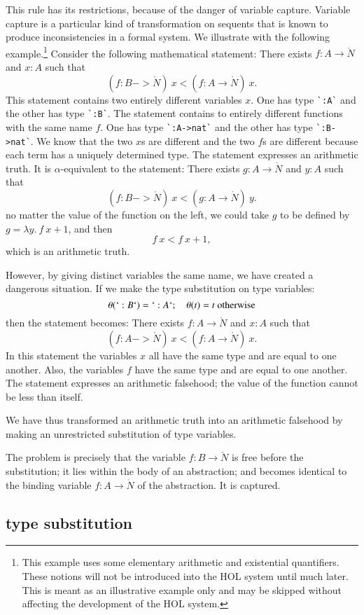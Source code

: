 \documentclass[cup9a]{cupbook}
\begin{document}
This rule has its restrictions, because of the danger of variable capture.  Variable capture is a particular kind of transformation on sequents that is known to produce inconsistencies in a formal system.  We illustrate with the following example.\footnote{This example uses some elementary arithmetic and existential quantifiers.  These notions will not be introduced into the HOL system until much later.  This is meant as an illustrative example only and may be skipped without affecting the development of the HOL system.}  Consider the following mathematical statement: There exists $f:A\to\ring{N}$ and $x:A$ such that
$$
(f:B->\ring{N})~x < (f:A\to\ring{N})~x.
$$
This statement contains two entirely different variables $x$.  One has type \verb!`:A`! and the other has type \verb!`:B`!.  The statement contains to entirely different functions with the same name $f$.  One has type \verb!`:A->nat`! and the other has type \verb!`:B->nat`!.  We know that the two $x$s are different and the two $f$s are different because each term has a uniquely determined type.  The statement expresses an arithmetic truth.  It is $\alpha$-equivalent to the statement: 
There exists $g:A\to\ring{N}$ and $y:A$ such that
$$
(f:B->\ring{N})~x < (g:A\to\ring{N})~y.
$$
no matter the value of the function on the left, we could take $g$ to be defined by $g = \lambda y.~f~x + 1$, and then
$$
f~x < f~x + 1,
$$
which is an arithmetic truth.

However, by giving distinct variables the same name, we have created a dangerous situation.  If we make the type substitution on type variables:
$$
\theta(`:B`) = `:A`;\quad \theta(t)=t\hbox{ otherwise}
$$
then the statement becomes:
There exists $f:A\to\ring{N}$ and $x:A$ such that
$$
(f:A->\ring{N})~x < (f:A\to\ring{N})~x.
$$
In this statement the variables $x$ all have the same type and are equal to one another.  Also, the variables $f$ have the same type and are equal to one another.  The statement expresses an arithmetic falsehood; the value of the function cannot be less than itself.

We have thus transformed an arithmetic truth into an arithmetic falsehood by making an unrestricted substitution of type variables.

The problem is precisely that the variable $f:B\to \ring{N}$ is free before the substitution; it lies within the body of an abstraction; and becomes identical to the binding variable $f:A\to\ring{N}$ of the abstraction.  It is captured.


\subsection{type substitution}
\end{document}

